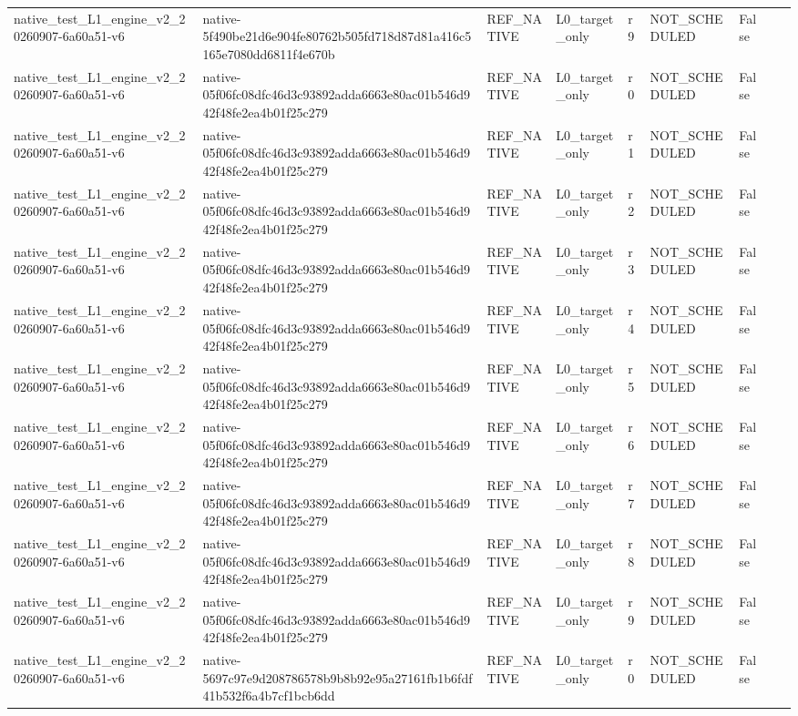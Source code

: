 \begin{tabular}{lllllllll}
native\_test\_L1\_engine\_v2\_20260907-6a60a51-v6 & native-5f490be21d6e904fe80762b505fd718d87d81a416c5165e7080dd6811f4e670b & REF\_NATIVE & L0\_target\_only & r9 & NOT\_SCHEDULED & False &  &  \\
native\_test\_L1\_engine\_v2\_20260907-6a60a51-v6 & native-05f06fc08dfc46d3c93892adda6663e80ac01b546d942f48fe2ea4b01f25c279 & REF\_NATIVE & L0\_target\_only & r0 & NOT\_SCHEDULED & False &  &  \\
native\_test\_L1\_engine\_v2\_20260907-6a60a51-v6 & native-05f06fc08dfc46d3c93892adda6663e80ac01b546d942f48fe2ea4b01f25c279 & REF\_NATIVE & L0\_target\_only & r1 & NOT\_SCHEDULED & False &  &  \\
native\_test\_L1\_engine\_v2\_20260907-6a60a51-v6 & native-05f06fc08dfc46d3c93892adda6663e80ac01b546d942f48fe2ea4b01f25c279 & REF\_NATIVE & L0\_target\_only & r2 & NOT\_SCHEDULED & False &  &  \\
native\_test\_L1\_engine\_v2\_20260907-6a60a51-v6 & native-05f06fc08dfc46d3c93892adda6663e80ac01b546d942f48fe2ea4b01f25c279 & REF\_NATIVE & L0\_target\_only & r3 & NOT\_SCHEDULED & False &  &  \\
native\_test\_L1\_engine\_v2\_20260907-6a60a51-v6 & native-05f06fc08dfc46d3c93892adda6663e80ac01b546d942f48fe2ea4b01f25c279 & REF\_NATIVE & L0\_target\_only & r4 & NOT\_SCHEDULED & False &  &  \\
native\_test\_L1\_engine\_v2\_20260907-6a60a51-v6 & native-05f06fc08dfc46d3c93892adda6663e80ac01b546d942f48fe2ea4b01f25c279 & REF\_NATIVE & L0\_target\_only & r5 & NOT\_SCHEDULED & False &  &  \\
native\_test\_L1\_engine\_v2\_20260907-6a60a51-v6 & native-05f06fc08dfc46d3c93892adda6663e80ac01b546d942f48fe2ea4b01f25c279 & REF\_NATIVE & L0\_target\_only & r6 & NOT\_SCHEDULED & False &  &  \\
native\_test\_L1\_engine\_v2\_20260907-6a60a51-v6 & native-05f06fc08dfc46d3c93892adda6663e80ac01b546d942f48fe2ea4b01f25c279 & REF\_NATIVE & L0\_target\_only & r7 & NOT\_SCHEDULED & False &  &  \\
native\_test\_L1\_engine\_v2\_20260907-6a60a51-v6 & native-05f06fc08dfc46d3c93892adda6663e80ac01b546d942f48fe2ea4b01f25c279 & REF\_NATIVE & L0\_target\_only & r8 & NOT\_SCHEDULED & False &  &  \\
native\_test\_L1\_engine\_v2\_20260907-6a60a51-v6 & native-05f06fc08dfc46d3c93892adda6663e80ac01b546d942f48fe2ea4b01f25c279 & REF\_NATIVE & L0\_target\_only & r9 & NOT\_SCHEDULED & False &  &  \\
native\_test\_L1\_engine\_v2\_20260907-6a60a51-v6 & native-5697c97e9d208786578b9b8b92e95a27161fb1b6fdf41b532f6a4b7cf1bcb6dd & REF\_NATIVE & L0\_target\_only & r0 & NOT\_SCHEDULED & False &  &  \\

\end{tabular}
